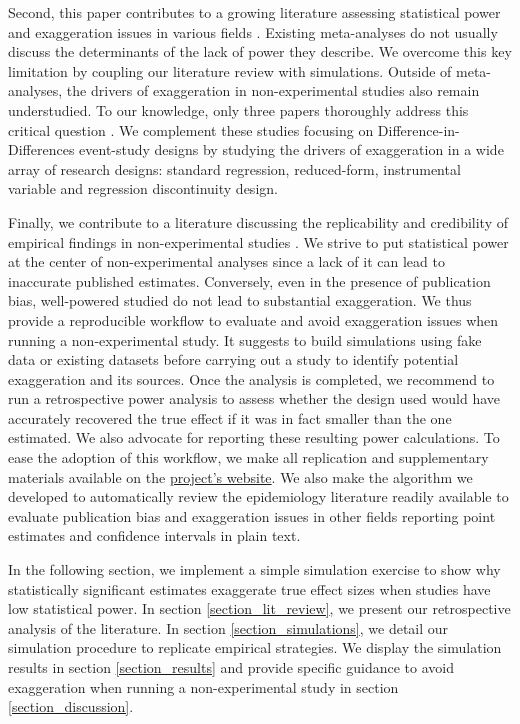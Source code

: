\documentclass[12pt]{article}
\begin{document}
    Second, this paper contributes to a growing literature assessing statistical power and exaggeration issues in various fields \citep{ioannidis_why_2008, gelman_beyond_2014, ioannidis_power_2017, ferraro_featureis_2020, stommes2021reliability, arel_bundock_quantitative_2022}. Existing meta-analyses do not usually discuss the determinants of the lack of power they describe. We overcome this key limitation by coupling our literature review with simulations. Outside of meta-analyses, the drivers of exaggeration in non-experimental studies also remain understudied. To our knowledge, only three papers thoroughly address this critical question \citep{schell_evaluating_2018, griffin_moving_2021, black_simulated_2022}. We complement these studies focusing on Difference-in-Differences event-study designs by studying the drivers of exaggeration in a wide array of research designs: standard regression, reduced-form, instrumental variable and regression discontinuity design.

    Finally, we contribute to a literature discussing the replicability and credibility of empirical findings in non-experimental studies \citep[for instance]{button_power_2013, open_science_collaboration_estimating_2015, camerer_evaluating_2018, brodeur_methods_2020}. We strive to put statistical power at the center of non-experimental analyses since a lack of it can lead to inaccurate published estimates. Conversely, even in the presence of publication bias, well-powered studied do not lead to substantial exaggeration. We thus provide a reproducible workflow to evaluate and avoid exaggeration issues when running a non-experimental study. It suggests to build simulations using fake data or existing datasets before carrying out a study to identify potential exaggeration and its sources. Once the analysis is completed, we recommend to run a retrospective power analysis to assess whether the design used would have accurately recovered the true effect if it was in fact smaller than the one estimated. We also advocate for reporting these resulting power calculations.
    To ease the adoption of this workflow, we make all replication and supplementary materials available on the \href{https://vincentbagilet.github.io/inference_pollution/}{project's website}. We also make the algorithm we developed to automatically review the epidemiology literature readily available to evaluate publication bias and exaggeration issues in other fields reporting point estimates and confidence intervals in plain text.

    In the following section, we implement a simple simulation exercise to show why statistically significant estimates exaggerate true effect sizes when studies have low statistical power. In section \ref{section_lit_review}, we present our retrospective analysis of the literature. In section \ref{section_simulations}, we detail our simulation procedure to replicate empirical strategies. We display the simulation results in section \ref{section_results} and provide specific guidance to avoid exaggeration when running a non-experimental study in section \ref{section_discussion}.
    
\end{document}
